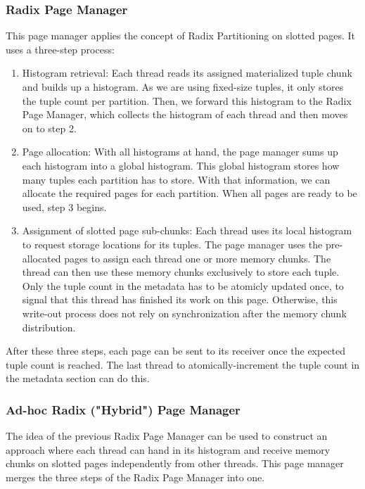 \subsubsection{Radix Page Manager} \label{subsubsection-Radix-Page-Manager}
This page manager applies the concept of Radix Partitioning on slotted pages.
It uses a three-step process:
\begin{enumerate}
  \item Histogram retrieval: Each thread reads its assigned materialized tuple chunk and
        builds up a histogram.
        As we are using fixed-size tuples, it only stores the tuple count per partition.
        Then, we forward this histogram to the Radix Page Manager, which collects the histogram of each thread and then moves on to step 2.

  \item Page allocation: With all histograms at hand, the page manager sums up each
        histogram into a global histogram.
        This global histogram stores how many tuples each partition has to store.
        With that information, we can allocate the required pages for each partition.
        When all pages are ready to be used, step 3 begins.

  \item  Assignment of slotted page sub-chunks: Each thread uses its local histogram to
        request storage locations for its tuples.
        The page manager uses the pre-allocated pages to assign each thread one or more memory chunks.
        The thread can then use these memory chunks exclusively to store each tuple.
        Only the tuple count in the metadata has to be atomicly updated once, to signal that this thread has finished its work on this page.
        Otherwise, this write-out process does not rely on synchronization after the memory chunk distribution.
\end{enumerate}
After these three steps, each page can be sent to its receiver once the expected tuple count is reached.
The last thread to atomically-increment the tuple count in the metadata section can do this.

\subsubsection{Ad-hoc Radix ("Hybrid") Page Manager} \label{subsubsection-Ad-hoc-Radix-Page-Manager}
The idea of the previous Radix Page Manager can be used to construct an approach where each thread can hand in its histogram and receive memory chunks on slotted pages independently from other threads.
This page manager merges the three steps of the Radix Page Manager into one.

